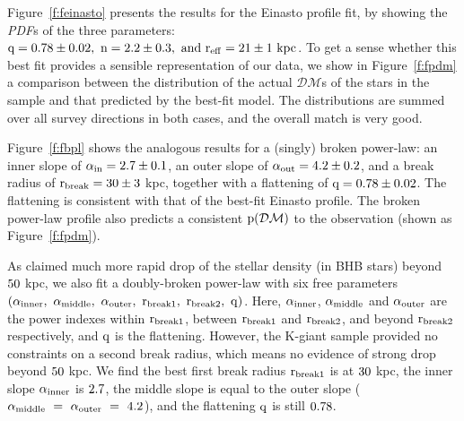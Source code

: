 \documentclass[12pt,preprint]{aastex}
\newcommand{\DM}{\mathcal{DM}}
\begin{document}
Figure~\ref{f:feinasto} presents the results for the Einasto profile fit, by showing the \textit{PDF}s of the three parameters: $\rm q=0.78\pm0.02,~n=2.2\pm0.3,~and ~r_{eff}=21\pm1~kpc$. To get a sense whether this best fit provides a sensible representation of our data, we show in Figure~\ref{f:fpdm}
a comparison between the distribution of the actual $\DM$s of the stars in the sample and that predicted by the best-fit model. The distributions are summed over all survey directions in both cases, and the overall match is very good. 

Figure~\ref{f:fbpl} shows the analogous results for a (singly) broken power-law: an inner slope of $\rm \alpha_{in}=2.7\pm0.1$, an outer slope of $\rm \alpha_{out}=4.2\pm0.2$, and a break radius of
 $\rm r_{break}=30\pm3~$kpc, together with a flattening of $\rm q=0.78\pm0.02$. The flattening is consistent with that of the best-fit Einasto profile. The broken power-law profile also predicts a consistent $\rm p(\DM)$ to the observation (shown as Figure~\ref{f:fpdm}).
 
As \citet{Deason2014} claimed much more rapid drop of the stellar density (in BHB stars) beyond $\rm 50~$kpc, we also fit a doubly-broken power-law with six free parameters $\rm \left(\alpha_{inner},~\alpha_{middle},~\alpha_{outer},~r_{break1},~r_{break2},~q\right)$. Here, $\rm \alpha_{inner}$, $\rm \alpha_{middle}$ and $\rm \alpha_{outer}$ are the power indexes within $\rm r_{break1}$, between $\rm r_{break1}$ and $\rm r_{break2}$, and beyond $\rm r_{break2}$ respectively, and $\rm q$ is the flattening. However, the K-giant sample provided no constraints on a second break radius, which means no evidence of strong drop beyond $\rm 50~$kpc. We find the best first break radius $\rm r_{break1}$ is at $\rm 30~$kpc, the inner slope $\rm \alpha_{inner}$ is $\rm 2.7$, the middle slope is equal to the outer slope ($\rm \alpha_{middle}~=~ \alpha_{outer}~=~4.2$), and the flattening $\rm q$ is still $\rm 0.78$.
\end{document}
